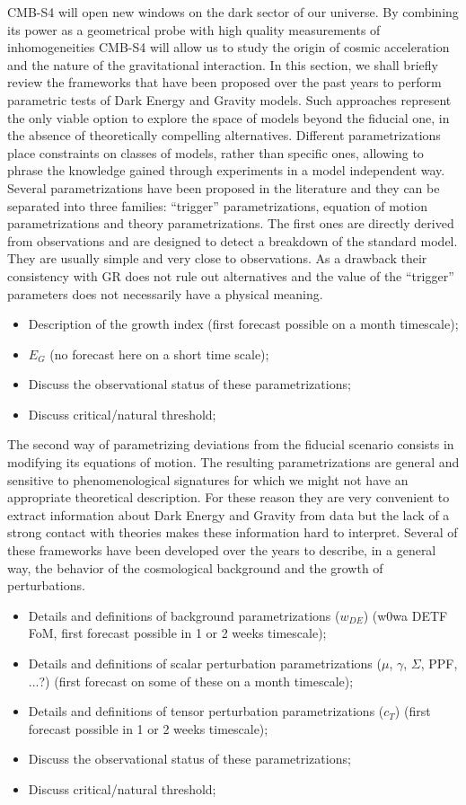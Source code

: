 CMB-S4 will open new windows on the dark sector of our universe. By combining its power as a geometrical probe with high quality measurements of inhomogeneities CMB-S4 will allow us to study the origin of cosmic acceleration and the nature of the gravitational interaction. In this section, we shall briefly review the frameworks that have been proposed over the past years to perform parametric tests of Dark Energy and Gravity models. Such approaches represent the only viable option to explore the space of models beyond the fiducial one, in the absence of theoretically compelling alternatives. Different parametrizations place constraints on classes of models, rather than specific ones, allowing to phrase the knowledge gained through experiments in a model independent way. \\
Several parametrizations have been proposed in the literature and they can be separated into three families: ``trigger'' parametrizations, equation of motion parametrizations and theory parametrizations. The first ones are directly derived from observations and are designed to detect a breakdown of the standard model. They are usually simple and very close to observations. As a drawback their consistency with GR does not rule out alternatives and the value of the ``trigger'' parameters does not necessarily have a physical meaning.
%
\begin{itemize}
\item Description of the growth index (first forecast possible on a month timescale);
\item $E_{G}$ (no forecast here on a short time scale);
\item Discuss the observational status of these parametrizations;
\item Discuss critical/natural threshold;
\end{itemize}
%
The second way of parametrizing deviations from the fiducial scenario consists in modifying its equations of motion. The resulting parametrizations are general and sensitive to phenomenological signatures for which we might not have an appropriate theoretical description. For these reason they are very convenient to extract information about Dark Energy and Gravity from data but the lack of a strong contact with theories makes these information hard to interpret. Several of these frameworks have been developed over the years to describe, in a general way, the behavior of the cosmological background and the growth of perturbations.
%
\begin{itemize}
\item Details and definitions of background parametrizations ($w_{DE}$) (w0wa DETF FoM, first forecast possible in 1 or 2 weeks timescale);
\item Details and definitions of scalar perturbation parametrizations ($\mu$, $\gamma$, $\Sigma$, PPF, ...?) (first forecast on some of these on a month timescale); 
\item Details and definitions of tensor perturbation parametrizations ($c_T$) (first forecast possible in 1 or 2 weeks timescale);
\item Discuss the observational status of these parametrizations;
\item Discuss critical/natural threshold;
\end{itemize}
